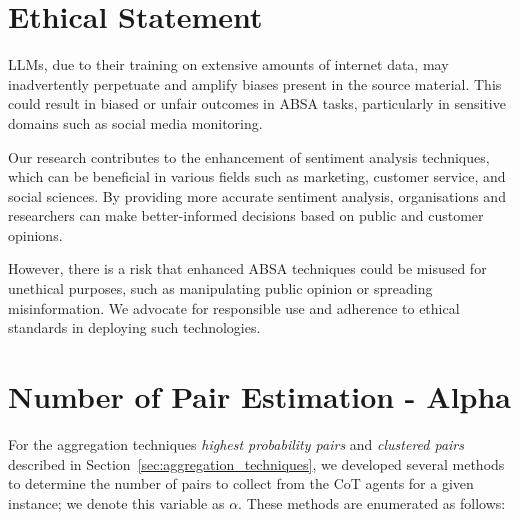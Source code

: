 \documentclass[11pt]{article}
\begin{document}


\section{Ethical Statement}
LLMs, due to their training on extensive amounts of internet data, may inadvertently perpetuate and amplify biases present in the source material. This could result in biased or unfair outcomes in ABSA tasks, particularly in sensitive domains such as social media monitoring.

Our research contributes to the enhancement of sentiment analysis techniques, which can be beneficial in various fields such as marketing, customer service, and social sciences. By providing more accurate sentiment analysis, organisations and researchers can make better-informed decisions based on public and customer opinions.

However, there is a risk that enhanced ABSA techniques could be misused for unethical purposes, such as manipulating public opinion or spreading misinformation. We advocate for responsible use and adherence to ethical standards in deploying such technologies.


%



\appendix

\section{Number of Pair Estimation - Alpha}
\label{sec:appendix:alpha}
For the aggregation techniques \textit{highest probability pairs} and \textit{clustered pairs} described in Section~\ref{sec:aggregation_techniques}, we developed several methods to determine the number of pairs to collect from the CoT agents for a given instance; we denote this variable as $\alpha$. These methods are enumerated as follows:
\end{document}
